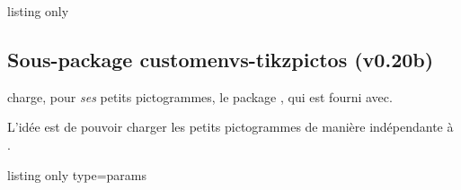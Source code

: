 \documentclass[french,11pt,a4paper]{article}
\begin{document}
\begin{DemoCode}{listing only}
\usepackage{customenvs}

\usepackage[option(s)]{customenvs}
\end{DemoCode}

\subsection{Sous-package customenvs-tikzpictos (v0.20b)}

 charge, pour \textit{ses} petits pictogrammes, le package , qui est fourni avec.

L'idée est de pouvoir charger les petits pictogrammes de manière indépendante à .

\begin{DemoCode}{listing only}
	{type=params}

\end{DemoCode}
\end{document}
